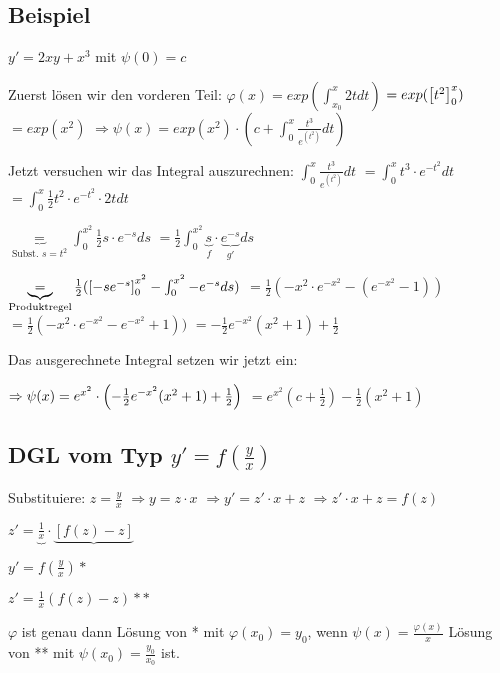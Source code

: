\renewcommand{\ldate}{2015-12-10}

\subsection{Beispiel}
$y' = 2xy + x^3$ mit $\psi(0) = c$

Zuerst lösen wir den vorderen Teil: $ \varphi(x) = exp(\int_{x_0}^{x} 2t dt)$
$=exp( \left[ t^2 \right] _0^x)$
$=exp(x^2)$
$\Rightarrow \psi(x) = exp(x^2) \cdot (c+\int_{0}^{x} \frac{t^3}{e^{(t^2)}} dt)$

Jetzt versuchen wir das Integral auszurechnen: 
$\int_{0}^{x} \frac{t^3}{e^{(t^2)}} dt $
$=\int_{0}^{x} t^3 \cdot e^{-t^2} dt $
$=\int_{0}^{x} \frac{1}{2} t^2 \cdot e^{-t^2} \cdot 2t dt$

$\underbrace{=}_{\textrm{Subst. } s=t^2} \int_{0}^{x^2} \frac{1}{2} s \cdot e^{-s} ds$
$=\frac{1}{2} \int_{0}^{x^2} \underbrace{s}_{f}\cdot \underbrace{e^{-s}}_{g'} ds$

$\underbrace{=}_{\textrm{Produktregel}} \frac{1}{2} ( \left[ -s e^{-s} \right] _0^{x^2} - \int_{0}^{x^2} - e^{-s} ds)$
$=\frac{1}{2} (-x^2 \cdot e^{-x^2} - (e^{-x^2} - 1) )$
$=\frac{1}{2} (-x^2 \cdot e^{-x^2} - e^{-x^2} + 1))$
$=-\frac{1}{2} e^{-x^2} (x^2+1) + \frac{1}{2}$

Das ausgerechnete Integral setzen wir jetzt ein: 

$\Rightarrow \psi(x) = e^{x^2} \cdot  \left( -\frac{1}{2} e^{-x^2} (x^2+1) + \frac{1}{2} \right) $
$=e^{x^2} (c+\frac{1}{2}) - \frac{1}{2} (x^2 + 1)$

\subsection{DGL vom Typ $y' = f(\frac{y}{x})$}
Substituiere: $z=\frac{y}{x}$
$\Rightarrow y=z \cdot x $
$\Rightarrow y' = z' \cdot x + z$
$\Rightarrow z'\cdot x + z = f(z)$

$z'= \underbrace{\frac{1}{x}} \cdot \underbrace{[f(z) - z]} $ 

\begin{satz}
$y' = f(\frac{y}{x}) *$

$z' = \frac{1}{x} (f(z)-z) **$

$\varphi$ ist genau dann Lösung von * mit $\varphi(x_0)=y_0$, wenn $\psi (x) = \frac{\varphi(x)}{x}$ Lösung von ** mit 
$ \psi(x_0) = \frac{y_0}{x_0}$ ist.
\end{satz}


